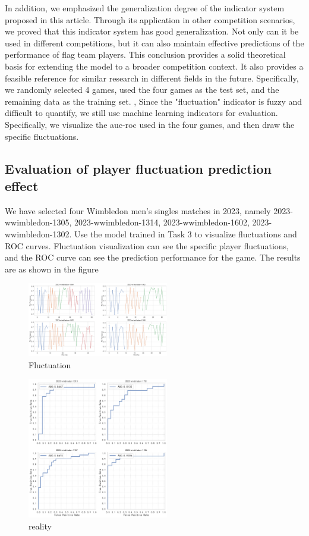 \documentclass{article}
\begin{document}
In addition, we emphasized the generalization degree of the indicator system proposed in this article. Through its application in other competition scenarios, we proved that this indicator system has good generalization. Not only can it be used in different competitions,
but it can also maintain effective predictions of the performance of flag team players. This conclusion provides a solid theoretical basis for extending the model to a broader competition context. It also provides a feasible reference for similar research in different fields in the future. Specifically,
we randomly selected 4 games, used the four games as the test set, and the remaining data as the training set. , Since the "fluctuation" indicator is fuzzy and difficult to quantify, we still use machine learning indicators for evaluation. Specifically, we visualize the auc-roc used in the four games, and then draw the specific fluctuations.

\subsection{Evaluation of player fluctuation prediction effect}
We have selected four Wimbledon men's singles matches in 2023, namely 2023-wwimbledon-1305, 2023-wwimbledon-1314, 2023-wwimbledon-1602, 2023-wwimbledon-1302. Use the model trained in Task 3 to visualize fluctuations and ROC curves. Fluctuation visualization can see the specific player fluctuations, and the ROC curve can see the prediction performance for the game. The results are as shown in the figure
\begin{figure}[H]
      \centering
      \includegraphics[width=0.55\textwidth]{fluctuation.png}
      \caption{Fluctuation}
\end{figure}
\begin{figure}[H]
      \centering
      \includegraphics[width=0.55\textwidth]{reality.png}
\caption{reality}
\end{figure}
\end{document}
